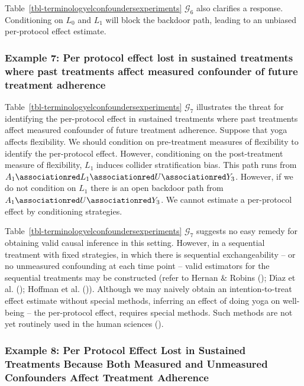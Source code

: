 \documentclass[
  single column]{article}
\begin{document}
Table~\ref{tbl-terminologyelconfoundersexperiments} \(\mathcal{G}_{6}\)
also clarifies a response. Conditioning on \(L_0\) and \(L_1\) will
block the backdoor path, leading to an unbiased per-protocol effect
estimate.

\subsubsection{Example 7: Per protocol effect lost in sustained
treatments where past treatments affect measured confounder of future
treatment
adherence}\label{example-7-per-protocol-effect-lost-in-sustained-treatments-where-past-treatments-affect-measured-confounder-of-future-treatment-adherence}

Table~\ref{tbl-terminologyelconfoundersexperiments} \(\mathcal{G}_{7}\)
illustrates the threat for identifying the per-protocol effect in
sustained treatments where past treatments affect measured confounder of
future treatment adherence. Suppose that yoga affects flexibility. We
should condition on pre-treatment measures of flexibility to identify
the per-protocol effect. However, conditioning on the post-treatment
measure of flexibility, \(\boxed{L_1}\) induces collider stratification
bias. This path runs from
\(A_1 \associationred L_1 \associationred U \associationred Y_3\).
However, if we do not condition on \(L_1\) there is an open backdoor
path from \(A_1 \associationred U \associationred Y_3\). We cannot
estimate a per-protocol effect by conditioning strategies.

Table~\ref{tbl-terminologyelconfoundersexperiments} \(\mathcal{G}_{7}\)
suggests no easy remedy for obtaining valid causal inference in this
setting. However, in a sequential treatment with fixed strategies, in
which there is sequential exchangeability -- or no unmeasured
confounding at each time point -- valid estimators for the sequential
treatments may be constructed (refer to Hernan \& Robins
(); Dı́az et al.
(); Hoffman et al.
()). Although we may naively obtain an
intention-to-treat effect estimate without special methods, inferring an
effect of doing yoga on well-being -- the per-protocol effect, requires
special methods. Such methods are not yet routinely used in the human
sciences ().

\subsubsection{Example 8: Per Protocol Effect Lost in Sustained
Treatments Because Both Measured and Unmeasured Confounders Affect
Treatment
Adherence}\label{example-8-per-protocol-effect-lost-in-sustained-treatments-because-both-measured-and-unmeasured-confounders-affect-treatment-adherence}
\end{document}
